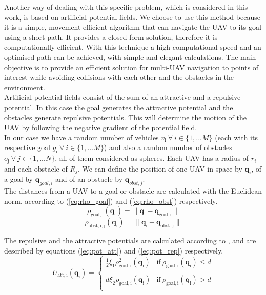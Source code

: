 \documentclass[journal]{IEEEtran}
\newcommand*{\subb}[1]{_{\mathrm{#1}}}
\begin{document}
		Another way of dealing with this specific problem, which is considered in this work, is based on artificial potential fields. We choose to use this method because it is a simple, movement-efficient algorithm that can navigate the UAV to its goal using a short path. It provides a closed form solution, therefore it is computationally efficient. With this technique a high computational speed and an optimised path can be achieved, with simple and elegant calculations\cite{Ge2002}. The main objective is to provide an efficient solution for multi-UAV navigation to points of interest while avoiding collisions with each other and the obstacles in the environment.\\
	
		Artificial potential fields consist of the sum of an attractive and a repulsive potential. In this case the goal generates the attractive potential and the obstacles generate repulsive potentials. This will determine the motion of the UAV by following the negative gradient of the potential field. \\
		
		In our case we have a random number of vehicles $v\subb{i} \ \forall \ i \in \{1, ...M\}$ (each with its respective goal $g\subb{i} \ \forall \ i \in \{1, ...M\}$) and also a random number of obstacles $o\subb{j} \ \forall \ j \in \{1, ...N\}$, all of them considered as spheres. Each UAV has a radius of $r_i$ and each obstacle of $R_j$. We can define the position of one UAV in space by $\bm{q}_i $, of a goal by $\bm{q}_{goal,i}$ and of an obstacle by $\bm{q}_{obst,j} $.\\
		
		The distances from a UAV to a goal or obstacle are calculated with the Euclidean norm, according to (\ref{eq:rho_goal}) and (\ref{eq:rho_obst}) respectively.
		\begin{equation} \label{eq:rho_goal}
			\rho\subb{goal, i}(\bm{q}\subb{i}) = \parallel \bm{q}\subb{i} - \bm{q}\subb{goal,i}\parallel
		\end{equation}
		\begin{equation} \label{eq:rho_obst}
			\rho\subb{obst, i, j}(\bm{q}\subb{i}) = \parallel \bm{q}\subb{i} - \bm{q}\subb{obst, j}\parallel
		\end{equation}
		
		The repulsive and the attractive potentials are calculated according to \cite{potfieldsmethod}, and are described by equations (\ref{eq:pot_att}) and (\ref{eq:pot_rep}) respectively.
 		\begin{equation} \label{eq:pot_att}
			U\subb{att, i}(\bm{q}\subb{i}) =  \left\lbrace  {\begin{array}{cc}
				\frac{1}{2} \xi\subb{1} \rho\subb{goal, i}^2(\bm{q}\subb{i})& \textrm{if} \ \rho\subb{goal, i}(\bm{q}\subb{i})\leq d \\
				\\
				d \xi\subb{2} \rho\subb{goal, i}(\bm{q}\subb{i}) &\textrm{if} \ \rho\subb{goal, i}(\bm{q}\subb{i})> d \\
				\end{array} } \right.
 		\end{equation}
 		
\end{document}
